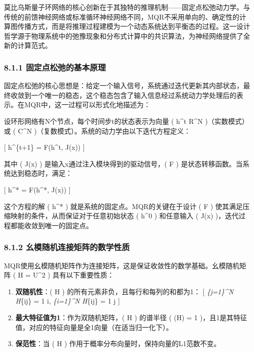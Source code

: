 \documentclass[
  12pt,
]{article}
\begin{document}
莫比乌斯量子环网络的核心创新在于其独特的推理机制------固定点松弛动力学。与传统的前馈神经网络或标准循环神经网络不同，MQR不采用单向的、确定性的计算图传播方式，而是将推理过程建模为一个动态系统达到平衡态的过程。这一设计哲学源于物理系统中的弛豫现象和分布式计算中的共识算法，为神经网络提供了全新的计算范式。

\hypertarget{ux56faux5b9aux70b9ux677eux5f1bux7684ux57faux672cux539fux7406}{%
\subsubsection{8.1.1
固定点松弛的基本原理}\label{ux56faux5b9aux70b9ux677eux5f1bux7684ux57faux672cux539fux7406}}

固定点松弛的核心思想是：给定一个输入信号，系统通过迭代更新其内部状态，最终收敛到一个唯一的稳态，这个稳态包含了输入信息经过系统动力学处理后的表示。在MQR中，这一过程可以形式化地描述为：

设环形网络有N个节点，每个时间步t的状态表示为向量 ( h\^{}t
\in R\^{}N )（实数模式）或 ( C\^{}N
)（复数模式）。系统的动力学由以下迭代方程定义：

{[} h\^{}\{t+1\} = F(h\^{}t, J(x)) {]}

其中 ( J(x) ) 是输入x通过注入模块得到的驱动信号，( F
) 是状态转移函数。当系统达到稳态时，满足：

{[} h\^{}* = F(h\^{}*, J(x)) {]}

这个方程的解 ( h\^{}* ) 就是系统的固定点。MQR的关键在于设计 (
F ) 使其满足压缩映射的条件，从而保证对于任意初始状态 ( h\^{}0
) 和任意输入 ( J(x) )，迭代过程都能收敛到唯一的固定点。

\hypertarget{ux5e7aux6a21ux968fux673aux8fdeux63a5ux77e9ux9635ux7684ux6570ux5b66ux6027ux8d28}{%
\subsubsection{8.1.2
幺模随机连接矩阵的数学性质}\label{ux5e7aux6a21ux968fux673aux8fdeux63a5ux77e9ux9635ux7684ux6570ux5b66ux6027ux8d28}}

MQR使用幺模随机矩阵作为连接矩阵，这是保证收敛性的数学基础。幺模随机矩阵
( H = \textbar U\textbar\^{}2 ) 具有以下重要性质：

\begin{enumerate}
\def\labelenumi{\arabic{enumi}.}
\item
  \textbf{双随机性}：( H ) 的所有元素非负，且每行和每列的和都为1： {[}
  \sum\emph{\{j=1\}\^{}N H}\{ij\} = 1 \quad \forall i,
  \quad \sum\emph{\{i=1\}\^{}N H}\{ij\} = 1 \quad \forall j {]}
\item
  \textbf{最大特征值为1}：作为双随机矩阵，( H ) 的谱半径 ( \rho(H) = 1
  )，且1是其特征值，对应的特征向量是全1向量（在适当归一化下）。
\item
  \textbf{保范性}：当 ( H ) 作用于概率分布向量时，保持向量的L1范数不变。
\end{enumerate}
\end{document}
